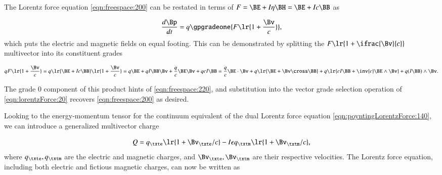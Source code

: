%
%
The Lorentz force equation \cref{eqn:freespace:200}
can be restated
in terms of \( F = \BE + I \eta \BH = \BE + I c \BB \) as

\begin{dmath}\label{eqn:lorentzForce:20}
\frac{d\Bp}{dt} = q \gpgradeone{ F \lr{ 1 + \frac{\Bv}{c} } },
\end{dmath}
which puts the electric and magnetic fields on equal footing.
This can be demonstrated by splitting the \( F \lr{ 1 + \ifrac{\Bv}{c} } \) multivector into its constituent grades

\begin{dmath}\label{eqn:lorentzForce:40}
q F \lr{ 1 + \frac{\Bv}{c} }
=
q
\lr{ \BE + I c \BB }
\lr{ 1 + \frac{\Bv}{c} }
=
q \BE
+ q I \BB \Bv
+ \frac{q}{c} \BE \Bv
+ q c I \BB
=
  \frac{q}{c} \BE \cdot \Bv
+ q \lr{ \BE + \Bv \cross \BB }
+ q \lr{ c I \BB + \inv{c} \BE \wedge \Bv }
+ q (I \BB) \wedge \Bv.
\end{dmath}

The grade 0 component of this product hints of \cref{eqn:freespace:220}, and substitution into the vector grade selection operation of \cref{eqn:lorentzForce:20} recovers \cref{eqn:freespace:200} as desired.

Looking to the energy-momentum tensor for the continuum equivalent of the dual Lorentz force equation \cref{eqn:poyntingLorentzForce:140}, we can introduce a generalized multivector charge

\begin{dmath}\label{eqn:lorentzForce:240}
Q =
q_\txte \lr{ 1 + \Bv_\txte/c }
-I \epsilon q_\txtm \lr{ 1 + \Bv_\txtm/c },
\end{dmath}
where \( q_\txte, q_\txtm \) are the electric and magnetic charges, and \( \Bv_\txte, \Bv_\txtm \) are their respective velocities.
The Lorentz force equation, including both electric and fictious magnetic charges, can now be written as

